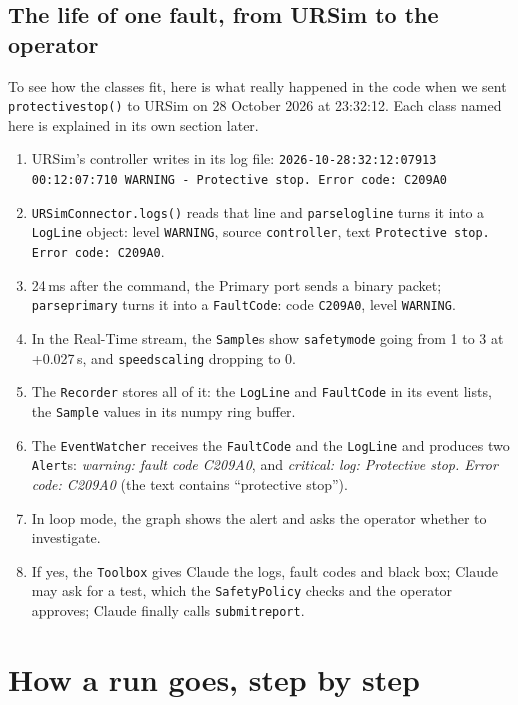 \documentclass[10pt]{article}
\newcommand{\brkus}{\textunderscore\allowbreak}
\newcommand{\f}[1]{\texttt{\let\_\brkus #1}}
\begin{document}
\subsection*{The life of one fault, from URSim to the operator}
To see how the classes fit, here is what really happened in the code when we sent
\f{protective\_stop()} to URSim on 28 October 2026 at 23:32:12. Each class named here is
explained in its own section later.
\begin{enumerate}
\item URSim's controller writes in its log file:
\f{2026-10-28\_23:32:12:07913 00:12:07:710 WARNING - Protective stop. Error code: C209A0}
\item \f{URSimConnector.logs()} reads that line and \f{parse\_log\_line} turns it into a
\f{LogLine} object: level \f{WARNING}, source \f{controller}, text
\f{Protective stop. Error code: C209A0}.
\item 24\,ms after the command, the Primary port sends a binary packet; \f{parse\_primary} turns
it into a \f{FaultCode}: code \f{C209A0}, level \f{WARNING}.
\item In the Real-Time stream, the \f{Sample}s show \f{safety\_mode} going from 1 to 3 at
+0.027\,s, and \f{speed\_scaling} dropping to 0.
\item The \f{Recorder} stores all of it: the \f{LogLine} and \f{FaultCode} in its event lists,
the \f{Sample} values in its numpy ring buffer.
\item The \f{EventWatcher} receives the \f{FaultCode} and the \f{LogLine} and produces two
\f{Alert}s: \emph{warning: fault code C209A0}, and \emph{critical: log: Protective stop. Error
code: C209A0} (the text contains ``protective stop'').
\item In loop mode, the graph shows the alert and asks the operator whether to investigate.
\item If yes, the \f{Toolbox} gives Claude the logs, fault codes and black box; Claude may ask
for a test, which the \f{SafetyPolicy} checks and the operator approves; Claude finally calls
\f{submit\_report}.
\end{enumerate}

\section{How a run goes, step by step}
\end{document}
